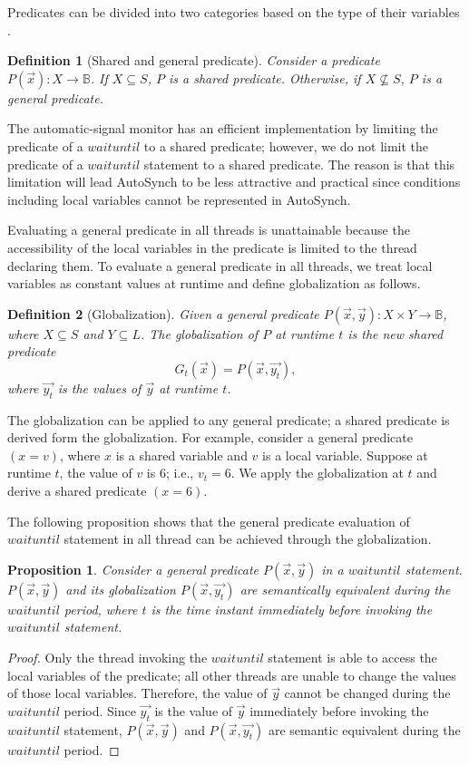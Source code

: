 \documentclass[preprint]{sigplanconf}
\newtheorem{definition}{Definition}
\newtheorem{proposition}{Proposition}
\begin{document}
Predicates can be divided into two categories based on the type of their 
variables \cite{bh05}.
\begin{definition}[Shared and general predicate]
    Consider a predicate $P(\vec{x}): X \rightarrow \mathbb{B}$. If $X 
    \subseteq S$, $P$ 
    is a shared predicate. Otherwise, if $X \not\subseteq S$, $P$ 
    is a general predicate. 
\end{definition}

The automatic-signal monitor has an efficient implementation \cite{kes77} by 
limiting the predicate of a $waituntil$ to a shared predicate; however, 
we do not limit the predicate of a $waituntil$ statement to a shared
predicate. The reason is that this limitation will lead AutoSynch to be less
attractive and practical since conditions including local variables cannot be 
represented in AutoSynch.

Evaluating a general predicate in all threads is unattainable 
because the accessibility of the local variables in the predicate is limited 
to the thread declaring them. To evaluate a general predicate in all 
threads, we treat local variables as constant values at runtime and define 
globalization as follows. 
\begin{definition}[Globalization]
    Given a general predicate $P(\vec{x}, \vec{y}): X \times Y \rightarrow 
    \mathbb{B}$, where $X \subseteq S$ and $Y \subseteq L$. The globalization 
    of $P$ at runtime $t$ is the new shared predicate
    \[
    G_t(\vec{x}) = P(\vec{x}, \vec{y_t}),
    \]
    where $\vec{y_t}$ is the values of $\vec{y}$ at runtime $t$.
\end{definition}

The globalization can be applied to any general predicate; a shared 
predicate is derived form the globalization. For example, consider a 
general predicate $(x = v)$, where $x$ is a shared variable and $v$ is a local
variable. Suppose at runtime $t$, the value of $v$ is $6$; i.e., $v_t=6$. We
apply the globalization at $t$ and derive a shared predicate $(x = 6)$. 

The following proposition shows that the general predicate evaluation of
$waituntil$ statement in all thread can be achieved through the globalization. 
\begin{proposition} \label{pro:glob}
    Consider a general predicate $P(\vec{x}, \vec{y})$ in a $waituntil$ 
    statement. $P(\vec{x}, \vec{y})$ and its globalization 
    $P(\vec{x}, \vec{y_t})$ are semantically equivalent during the $waituntil$ 
    period, where $t$ is the time instant immediately before invoking the 
    $waituntil$ statement.  
\end{proposition}
\begin{proof}
    Only the thread invoking the $waituntil$ statement is able to access the
    local variables of the predicate; all other threads are unable to change
    the values of those local variables. Therefore, the value of $\vec{y}$
    cannot be changed 
    during the $waituntil$ period. Since $\vec{y_t}$ is the value of $\vec{y}$
    immediately before invoking the $waituntil$ statement, $P(\vec{x}, \vec{y})$
    and $P(\vec{x}, \vec{y_t})$ are semantic equivalent during the $waituntil$
    period. 
\end{proof}
\end{document}
